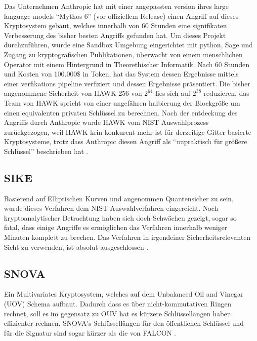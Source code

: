 Das Unternehmen Anthropic hat mit einer angepassten version ihres large language models \enquote{Mythos 6} (vor offiziellem Release) einen Angriff auf dieses Kryptosystem gebaut, welches innerhalb von 60 Stunden eine signifikaten Verbesserung des bisher besten Angriffs gefunden hat.
Um dieses Projekt durchzuführen, wurde eine Sandbox Umgebung eingerichtet mit python, Sage und Zugang zu kryptografischen Publikationen, überwacht von einem menschlichen Operator mit einem Hintergrund in Theorethischer Informatik.
Nach 60 Stunden und Kosten von 100.000\$ in Token, hat das System dessen Ergebnisse mittels einer verfikations pipeline verfiziert und dessen Ergebnisse präsentiert.
Die bisher angenommene Sicherheit von HAWK-256 von $2^{64}$ lies sich auf $2^{38}$ reduzieren, das Team von HAWK spricht von einer ungefähren halbierung der Blockgröße um einen equivalenten privaten Schlüssel zu berechnen.
Nach der entdeckung des Angriffs durch Anthropic wurde HAWK vom NIST Auswahlprozess zurückgezogen, weil HAWK kein konkurent mehr ist für derzeitige Gitter-basierte Kryptosysteme, trotz dass Anthropic diesen Angriff als \enquote{unpraktisch für größere Schlüssel} beschrieben hat \cite{DiscoveringCryptographicWeaknesses2026,Hawk,straznickasHAWKnKeyRecoveryReduces}.

\subsection{SIKE}
Basierend auf Elliptischen Kurven und angenommen Quantensicher zu sein, wurde dieses Verfahren dem NIST Auswahlverfahren eingereicht.
Nach kryptoanalytischer Betrachtung haben sich doch Schwächen gezeigt, sogar so fatal, dass einige Angriffe es ermöglichen das Verfahren innerhalb weniger Minuten komplett zu brechen.
Das Verfahren in irgendeiner Sicherheitsrelevanten Sicht zu verwenden, ist absolut ausgeschlossen \cite{cepelewiczPostQuantumCryptographyScheme2022,SIKESupersingularIsogeny}.

\subsection{SNOVA}
Ein Multivariates Kryptosystem, welches auf dem Unbalanced Oil and Vinegar (UOV) Schema aufbaut.
Dadurch dass es über nicht-kommutativen Ringen rechnet, soll es im gegensatz zu OUV hat es kürzere Schlüssellängen haben effizienter rechnen.
SNOVA's Schlüssellängen für den öffentlichen Schlüssel und für die Signatur sind sogar kürzer als die von FALCON \cite{SNOVAPostQuantumDigital,saarinenPostQuantumCryptography15th2024}.

